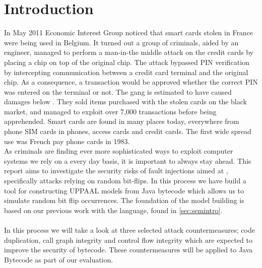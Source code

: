 \chapter{Introduction}
In May 2011 Economic Interest Group noticed that smart cards stolen in France were being used in Belgium\cite{fun}. It turned out a group of criminals, aided by an engineer, managed to perform a man-in-the middle attack on the credit cards by placing a chip on top of the original chip. The attack bypassed PIN verification by intercepting communication between a credit card terminal and the original chip. As a consequence, a transaction would be approved whether the correct PIN was entered on the terminal or not. The gang is estimated to have caused damages below . They sold items purchased with the stolen cards on the black market, and managed to exploit over 7,000 transactions before being apprehended. Smart cards are found in many places today, everywhere from phone SIM cards in phones, access cards and credit cards. The first wide spread use was French pay phone cards in 1983\cite[p. 366]{modbank}.\\

\noindent As criminals are finding ever more sophisticated ways to exploit computer systems we rely on a every day basis, it is important to always stay ahead.
This report aims to investigate the security risks of fault injections aimed at \jc, specifically attacks relying on random bit-flips. 
In this process we have build a tool for constructing UPPAAL\cite{upptut} models from Java bytecode which allows us to simulate random bit flip occurrences. 
The foundation of the model building is based on our previous work with the \jcl language, found in \cref{sec:semintro}.\\\\
In this process we will take a look at three selected attack countermeasures; code duplication, call graph integrity and control flow integrity which are expected to improve the security of \jc bytecode. 
These countermeasures will be applied to Java Bytecode as part of our evaluation.